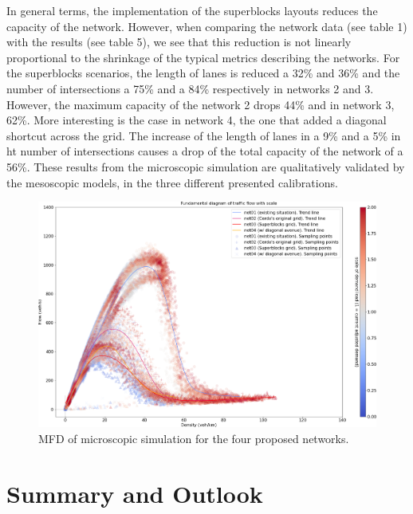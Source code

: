 \documentclass[11pt]{article}
\begin{document}
In general terms, the implementation of the superblocks layouts reduces the capacity of the network. However, when comparing the network data (see table 1) with the results (see table 5), we see that this reduction is not linearly proportional to the shrinkage of the typical metrics describing the networks. For the superblocks scenarios, the length of lanes is reduced a 32\% and 36\% and the number of intersections a 75\% and a 84\% respectively in networks 2 and 3. However, the maximum capacity of the network 2 drops 44\% and in network 3, 62\%.
More interesting is the case in network 4, the one that added a diagonal shortcut across the grid. The increase of the length of lanes in a 9\% and a 5\% in ht number of intersections causes a drop of the total capacity of the network of a 56\%.
These results from the microscopic simulation are qualitatively validated by the mesoscopic models, in the three different presented calibrations.

\begin{figure}[htbp]
\centering
\includegraphics[width=\textwidth]{code/simulations/charts/MFD02_compar_01-02-03-04_micro.png}
\caption{MFD of microscopic simulation for the four proposed networks.}
\label{fig:MFD of microscopic simulation for the four proposed networks.}
\end{figure}





\section{Summary and Outlook}



\end{document}
